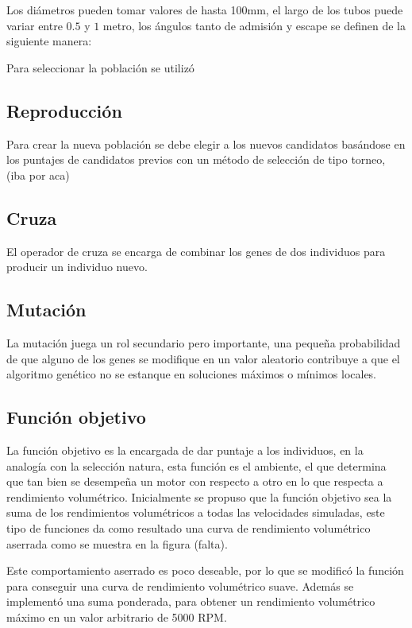 Los diámetros pueden tomar valores de hasta 100mm, el largo de los
tubos puede variar entre $0.5$ y $1$ metro, los ángulos tanto de
admisión y escape se definen de la siguiente manera:



Para seleccionar la población se utilizó 


\subsection{Reproducción}

Para crear la nueva población se debe elegir a los nuevos candidatos basándose
en los puntajes de candidatos previos con un método de selección de tipo
torneo, (iba por aca)

\subsection{Cruza}
%
El operador de cruza se encarga de combinar los genes de dos individuos para
producir un individuo nuevo.

\subsection{Mutación}
%
La mutación juega un rol secundario pero importante, una pequeña probabilidad
de que alguno de los genes se modifique en un valor aleatorio contribuye a que
el algoritmo genético no se estanque en soluciones máximos o mínimos locales.

\subsection{Función objetivo}
%
La función objetivo es la encargada de dar puntaje a los individuos, en la
analogía con la selección natura, esta función es el ambiente, el que determina
que tan bien se desempeña un motor con respecto a otro en lo que respecta a
rendimiento volumétrico.
%
Inicialmente se propuso que la función objetivo sea la suma de los rendimientos
volumétricos a todas las velocidades simuladas, este tipo de funciones da como
resultado una curva de rendimiento volumétrico aserrada como se muestra en la
figura (falta).

Este comportamiento aserrado es poco deseable, por lo que se modificó la
función para conseguir una curva de rendimiento volumétrico suave.
%
Además se implementó una suma ponderada, para obtener un rendimiento
volumétrico máximo en un valor arbitrario de 5000 RPM.

